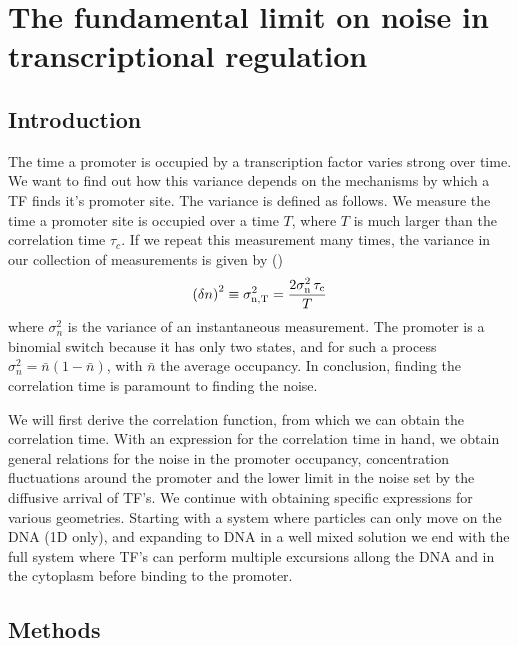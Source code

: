 \section{The fundamental limit on noise in transcriptional regulation}

\subsection{Introduction}
The time a promoter is occupied by a transcription factor varies strong over time. We want to find out how this variance depends on the mechanisms by which a TF finds it's promoter site. The variance is defined as follows. We measure the time a promoter site is occupied over a time $T$, where $T$ is much larger than the correlation time $\tau_c$. If we repeat this measurement many times, the variance in our collection of measurements is given by ()
\begin{equation}
 \left( \delta n \right)^2 \equiv \sigma_{\rm n, T}^2 = \frac{2 \sigma_{\rm n}^2 \,\tau_{\rm c}}{T}
 \elabel{std_devT}
\end{equation}
where $\sigma_n^2$ is the variance of an instantaneous measurement. The promoter is a binomial switch because it has only two states, and for such a process $\sigma^2_n = \bar{n}(1-\bar{n})$, with $\bar{n}$ the average occupancy. In conclusion, finding the correlation time is paramount to finding the noise.

We will first derive the correlation function, from which we can obtain the correlation time. With an expression for the correlation time in hand, we obtain general relations for the noise in the promoter occupancy, concentration fluctuations around the promoter and the lower limit in the noise set by the diffusive arrival of TF's. We continue with obtaining specific expressions for various geometries. Starting with a system where particles can only move on the DNA (1D only), and expanding to DNA in a well mixed solution we end with the full system where TF's can perform multiple excursions allong the DNA and in the cytoplasm before binding to the promoter.


\subsection{Methods}

